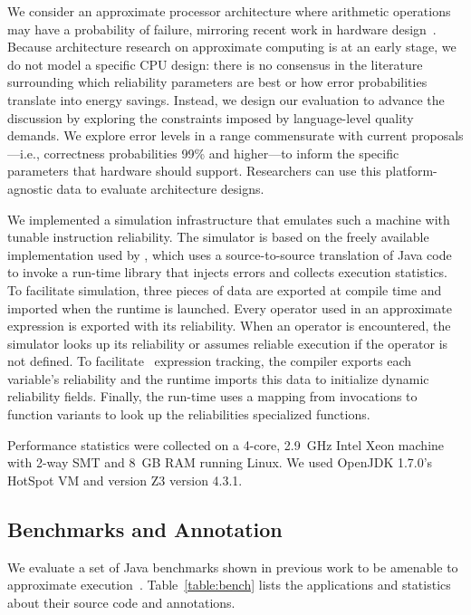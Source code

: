 {We consider an approximate processor architecture where arithmetic
operations may have a probability of failure, mirroring recent work in
hardware design~\cite{truffle, quora, kim-hpca, uva-adder}.
Because architecture research on approximate computing is at an early stage,
we do not model a specific CPU design: there is no consensus in the literature
surrounding which reliability parameters are best or how error probabilities
translate into energy savings.
Instead, we design our evaluation to advance the discussion by exploring the
constraints imposed by language-level quality demands.
We explore error levels in a range commensurate with current proposals---i.e.,
correctness probabilities 99\% and higher---to inform the specific parameters
that hardware should support.
Researchers can use this platform-agnostic data to evaluate architecture
designs.

We implemented a simulation
infrastructure that emulates such a machine with tunable instruction
reliability.  The
simulator is based on the freely available implementation used by
\citet{enerj}, which uses a
source-to-source translation of Java code to invoke a run-time library that
injects errors and collects execution statistics.  To facilitate simulation,
three pieces of data are exported at compile time and imported when the runtime
is launched.  Every operator used in an approximate expression is exported with
its reliability.  When an operator is encountered, the simulator looks up its
reliability or assumes reliable execution if the operator is not defined.
To facilitate \Dyn\ expression tracking, the compiler exports each variable's
reliability and the runtime imports this data to initialize dynamic
reliability fields.
Finally, the run-time uses a mapping from invocations to function
variants to look up the reliabilities specialized functions.

Performance statistics were collected on a 4-core, 2.9~GHz Intel Xeon machine
with 2-way SMT and 8~GB RAM running Linux.
We used OpenJDK 1.7.0's HotSpot VM and version Z3 version 4.3.1.

\subsection{Benchmarks and Annotation}

We evaluate a set of Java benchmarks shown in previous work to be amenable to
approximate execution~\cite{enerj, approxstorage}.
Table~\ref{table:bench} lists the applications and statistics about their
source code and annotations.

}
